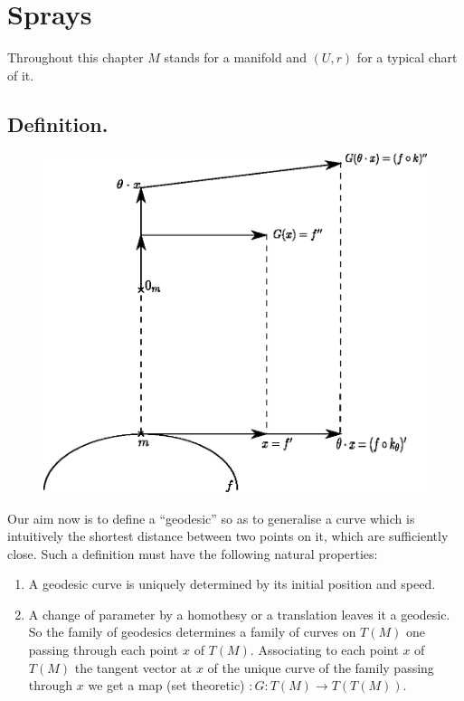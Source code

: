 \chapter{Sprays}\label{chap1:chap1}

Throughout \pageoriginale this chapter $M$ stands for a manifold and
$(U,r)$ for a typical chart of it.

\section{Definition.}

\begin{figure}[H]
\centering
\includegraphics[scale=.7]{chap1-fig1.eps}
\end{figure}


\quad Our aim now is to define a ``geodesic'' so as to generalise a curve
which is intuitively the shortest distance between two points on it,
which are sufficiently close. Such a definition must have the
following natural properties:
\begin{enumerate}
\renewcommand{\labelenumi}{\rm\theenumi)}
\item A geodesic curve is uniquely determined by its initial position
  and speed.

\item A change of parameter by a homothesy or a translation 
  leaves \pageoriginale it
  a geodesic. So the family of geodesics determines a family of curves
  on $T(M)$ one passing through each point $x$ of $T(M)$. Associating
  to each point $x$ of $T(M)$ the tangent vector at $x$ of the unique
  curve of the family passing through $x$ we get a map (set theoretic)
  $:G:T(M)\to T(T(M))$.
\end{enumerate}

